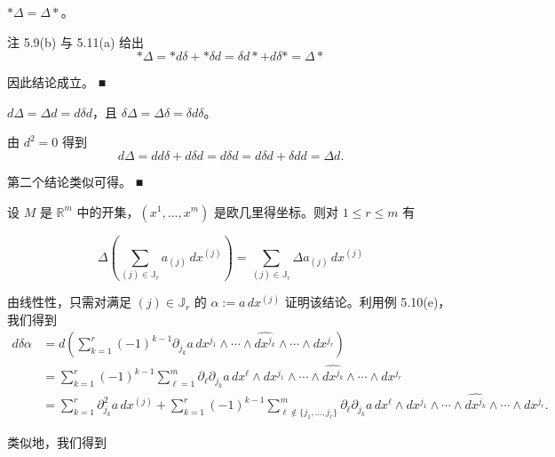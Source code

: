 \begin{remark}

\begin{items}
\item

$ \ast\Delta = \Delta\ast $。

\proofhead
注 5.9(b) 与 5.11(a) 给出
\[
\ast\Delta = \ast d\delta + \ast\delta d = \delta d\ast + d\delta\ast = \Delta\ast
\]

因此结论成立。 \nobreak\hspace{0.35em}■

\item

$ d\Delta = \Delta d = d\delta d $，且 $ \delta\Delta = \Delta\delta = \delta d\delta $。

\proofhead
由 $ d^{2} = 0 $ 得到
\[
d\Delta = dd\delta + d\delta d = d\delta d = d\delta d + \delta dd = \Delta d .
\]

第二个结论类似可得。 \nobreak\hspace{0.35em}■

\item

设 $ M $ 是 $ \mathbb{R}^{m} $ 中的开集，$ (x^{1},\ldots,x^{m}) $ 是欧几里得坐标。则对 $ 1 \le r \le m $ 有

\[
\Delta\left(\sum_{(j)\in\mathbb{J}_{r}} a_{(j)}\, dx^{(j)}\right) = \sum_{(j)\in\mathbb{J}_{r}} \Delta a_{(j)}\, dx^{(j)}
\]

\proofhead
由线性性，只需对满足 $ (j) \in \mathbb{J}_{r} $ 的 $ \alpha := a\, dx^{(j)} $ 证明该结论。利用例 5.10(e)，我们得到
\begin{equation*}
\begin{aligned}
d\delta\alpha &= d\left(\sum_{k=1}^{r}(-1)^{k-1}\partial_{j_{k}}a\, dx^{j_{1}}\wedge\cdots\wedge\widehat{dx^{j_{k}}}\wedge\cdots\wedge dx^{j_{r}}\right) \\ &= \sum_{k=1}^{r}(-1)^{k-1}\sum_{\ell=1}^{m}\partial_{\ell}\partial_{j_{k}}a\, dx^{\ell}\wedge dx^{j_{1}}\wedge\cdots\wedge\widehat{dx^{j_{k}}}\wedge\cdots\wedge dx^{j_{r}} \\ &= \sum_{k=1}^{r}\partial_{j_{k}}^{2}a\, dx^{(j)} + \sum_{k=1}^{r}(-1)^{k-1}\sum_{\ell\notin\{j_{1},\ldots,j_{r}\}}^{m}\partial_{\ell}\partial_{j_{k}}a\, dx^{\ell}\wedge dx^{j_{1}}\wedge\cdots\wedge\widehat{dx^{j_{k}}}\wedge\cdots\wedge dx^{j_{r}} .
\end{aligned}
\end{equation*}

类似地，我们得到


\end{items}
\end{remark}
